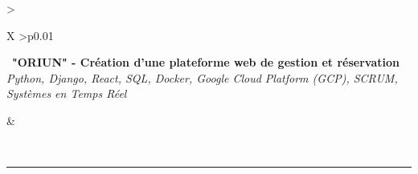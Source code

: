 \begin{tabularx}{\textwidth}{>{\raggedright\arraybackslash}X >{\raggedleft\arraybackslash}p{0.01\textwidth}}
    \begin{minipage}[t]{\linewidth}\raggedright
      \textbullet\ \textbf{"ORIUN" - Création d'une plateforme web de gestion et réservation}\\
      \textit{\footnotesize Python, Django, React, SQL, Docker, Google Cloud Platform (GCP), SCRUM, Systèmes en Temps Réel}\\
    \end{minipage}
    &
    \begin{minipage}[t]{\linewidth}\raggedleft %
    \end{minipage}\\

  \end{tabularx}



  

\vspace{4pt}
\noindent\rule{\textwidth}{0.4pt}
\vspace{0.4pt}

